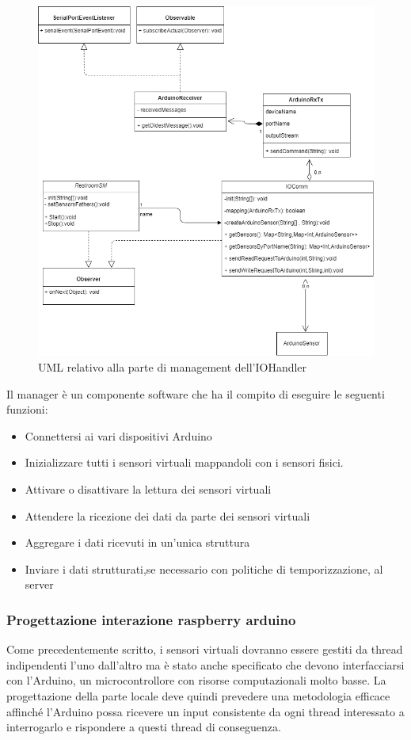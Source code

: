 \documentclass[12pt]{article}
\begin{document}
\begin{figure}[h!]
\centering
	\includegraphics[scale=0.55]{img/parteLocale/UmlManager.png}  
    \caption{UML relativo alla parte di management dell'IOHandler}
\end{figure}
Il manager è un componente software che ha il compito di eseguire le seguenti funzioni:
\begin{itemize}
\item Connettersi ai vari dispositivi Arduino
\item Inizializzare tutti i sensori virtuali mappandoli con i sensori fisici.
\item Attivare o disattivare la lettura dei sensori virtuali
\item Attendere la ricezione dei dati da parte dei sensori virtuali
\item Aggregare i dati ricevuti in un'unica struttura
\item Inviare i dati strutturati,se necessario con politiche di temporizzazione, al server
\end{itemize}
\subsubsection{Progettazione interazione raspberry arduino}
Come precedentemente scritto, i sensori virtuali dovranno essere gestiti da thread indipendenti l'uno dall'altro ma è stato anche specificato che devono interfacciarsi con l'Arduino, un microcontrollore con risorse computazionali molto basse. La progettazione della parte locale deve quindi prevedere una metodologia efficace affinché l'Arduino possa ricevere un input consistente da ogni thread interessato a interrogarlo e rispondere a questi thread di conseguenza.
\end{document}
